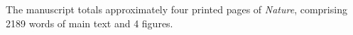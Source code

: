 \documentclass[stdletter,letterpaper,addrfromright,orderfromdateto,dateleft,11pt,noaddrto,noaddrfrom,sigleft]{newlfm}
\begin{document}
\begin{newlfm}

The manuscript totals approximately four printed pages of \textsl{Nature}, comprising 2189 words of main text and 4 figures.

\end{newlfm}
\end{document}
